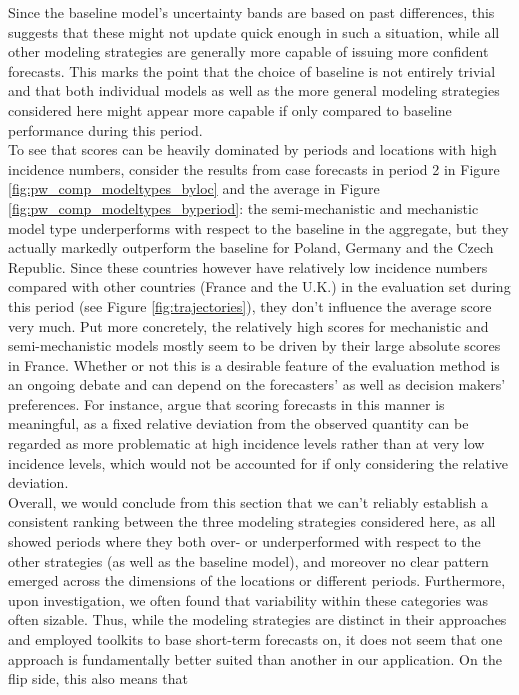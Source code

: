 Since the baseline model's uncertainty bands are based on past differences, this suggests that these might not update quick enough in such a situation, while all other modeling strategies are generally more capable of issuing more confident forecasts. This marks the point that the choice of baseline is not entirely trivial and that both individual models as well as the more general modeling strategies considered here might appear more capable if only compared to baseline performance during this period. \medskip \\
To see that scores can be heavily dominated by periods and locations with high incidence numbers, consider the results from case forecasts in period 2 in Figure \ref{fig:pw_comp_modeltypes_byloc} and the average in Figure \ref{fig:pw_comp_modeltypes_byperiod}: the semi-mechanistic and mechanistic model type underperforms with respect to the baseline in the aggregate, but they actually markedly outperform the baseline for Poland, Germany and the Czech Republic. Since these countries however have relatively low incidence numbers compared with other countries (France and the U.K.) in the evaluation set during this period (see Figure \ref{fig:trajectories}), they don't influence the average score very much. Put more concretely, the relatively high scores for mechanistic and semi-mechanistic models mostly seem to be driven by their large absolute scores in France. Whether or not this is a desirable feature of the evaluation method is an ongoing debate and can depend on the forecasters' as well as decision makers' preferences. For instance, \cite{bracher_evaluating_2021} argue that scoring forecasts in this manner is meaningful, as a fixed relative deviation from the observed quantity can be regarded as more problematic at high incidence levels rather than at very low incidence levels, which would not be accounted for if only considering the relative deviation. \medskip\\  
Overall, we would conclude from this section that we can't reliably establish a consistent ranking between the three modeling strategies considered here, as all showed periods where they both over- or underperformed with respect to the other strategies (as well as the baseline model), and moreover no clear pattern emerged across the dimensions of the locations or different periods. Furthermore, upon investigation, we often found that variability within these categories was often sizable. Thus, while the modeling strategies are distinct in their approaches and employed toolkits to base short-term forecasts on, it does not seem that one approach is fundamentally better suited than another in our application. On the flip side, this also means that%
